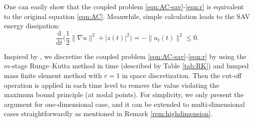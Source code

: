 \documentclass[a4paper, oneside]{book}
\def\d{{\mathrm{d}}}
\def\d{\mathrm{d}}
\begin{document}
One can easily show that the coupled problem \eqref{eqn:AC-sav}-\eqref{eqn:r} is equivalent to the original
equation \eqref{eqn:AC}.  Meanwhile, simple calculation leads to the SAV energy dissipation:
\begin{equation}\label{eq:SAV_energy}
  \frac{\d}{\d t} \Big(\frac12\|\nabla u\|^2 + |z(t)|^2 \Big)=-\|u_t(t)\|^2 \le 0.
\end{equation}

Inspired by \cite{akrivis2019energy},
we discretize the coupled problem \eqref{eqn:AC-sav}-\eqref{eqn:r}
by using the  $m$-stage Runge--Kutta method in time (described by Table \ref{tab:RK}) and  lumped mass
finite element method with $r=1$ in space discretization. Then the cut-off operation is applied in each time level
to remove the value violating the maximum bound principle (at nodal points).
For simplicity, we only present the argument for one-dimensional case,
and it can be extended to multi-dimensional cases straightforwardly as mentioned in Remark \ref{rem:highdimension}.
\end{document}
